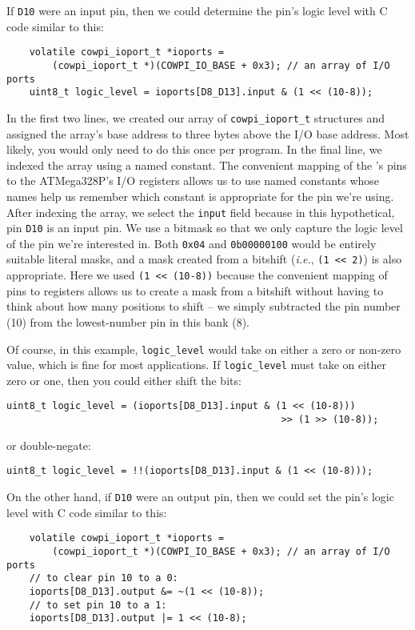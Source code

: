 If \texttt{D10} were an input pin, then we could determine the pin's logic level with C code similar to this:
\begin{lstlisting}
    volatile cowpi_ioport_t *ioports =
        (cowpi_ioport_t *)(COWPI_IO_BASE + 0x3); // an array of I/O ports
    uint8_t logic_level = ioports[D8_D13].input & (1 << (10-8));
\end{lstlisting}
In the first two lines, we created our array of \lstinline{cowpi_ioport_t} structures and assigned the array's base address to three bytes above the I/O base address.
Most likely, you would only need to do this once per program.
In the final line, we indexed the array using a named constant.
The convenient mapping of the \mcuboard's pins to the ATMega328P's I/O registers allows us to use named constants whose names help us remember which constant is appropriate for the pin we're using.
After indexing the array, we select the \lstinline{input} field because in this hypothetical, pin \texttt{D10} is an input pin.
We use a bitmask so that we only capture the logic level of the pin we're interested in.
Both \lstinline{0x04} and \lstinline{0b00000100} would be entirely suitable literal masks, and a mask created from a bitshift (\textit{i.e.}, \lstinline{(1 << 2)}) is also appropriate.
Here we used \lstinline{(1 << (10-8))} because the convenient mapping of pins to registers allows us to create a mask from a bitshift without having to think about how many positions to shift -- we simply subtracted the pin number (10) from the lowest-number pin in this bank (8).

Of course, in this example, \lstinline{logic_level} would take on either a zero or non-zero value, which is fine for most applications.
If \lstinline{logic_level} must take on either zero or one, then you could either shift the bits:
\begin{lstlisting}[firstnumber=3]
    uint8_t logic_level = (ioports[D8_D13].input & (1 << (10-8)))
                                                >> (1 >> (10-8));
\end{lstlisting}
or double-negate:
\begin{lstlisting}[firstnumber=3]
    uint8_t logic_level = !!(ioports[D8_D13].input & (1 << (10-8)));
\end{lstlisting}

On the other hand, if \texttt{D10} were an output pin, then we could set the pin's logic level with C code similar to this:
\newpage
\begin{lstlisting}
    volatile cowpi_ioport_t *ioports =
        (cowpi_ioport_t *)(COWPI_IO_BASE + 0x3); // an array of I/O ports
    // to clear pin 10 to a 0:
    ioports[D8_D13].output &= ~(1 << (10-8));
    // to set pin 10 to a 1:
    ioports[D8_D13].output |= 1 << (10-8);
\end{lstlisting}

